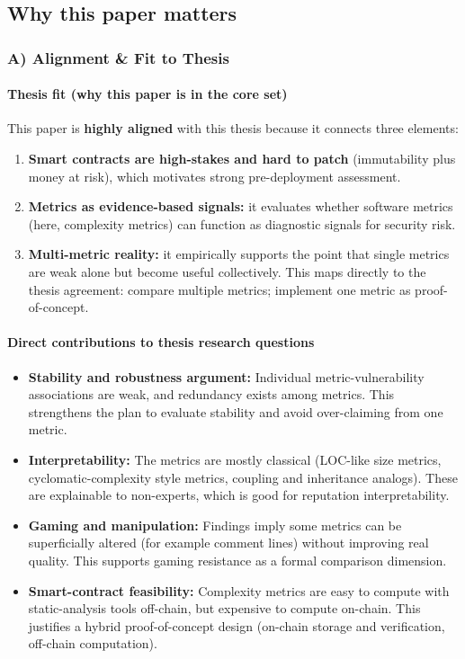 \documentclass[11pt,a4paper]{article}
\begin{document}
\subsection{Why this paper matters}
\subsubsection*{A) Alignment \& Fit to Thesis}
\paragraph{Thesis fit (why this paper is in the core set)}
This paper is \textbf{highly aligned} with this thesis because it connects three elements:
\begin{enumerate}[leftmargin=*]
  \item \textbf{Smart contracts are high-stakes and hard to patch} (immutability plus money at risk), which motivates strong pre-deployment assessment.
  \item \textbf{Metrics as evidence-based signals:} it evaluates whether software metrics (here, complexity metrics) can function as diagnostic signals for security risk.
  \item \textbf{Multi-metric reality:} it empirically supports the point that single metrics are weak alone but become useful collectively. This maps directly to the thesis agreement: compare multiple metrics; implement one metric as proof-of-concept.
\end{enumerate}

\paragraph{Direct contributions to thesis research questions}
\begin{itemize}[leftmargin=*]
  \item \textbf{Stability and robustness argument:} Individual metric-vulnerability associations are weak, and redundancy exists among metrics. This strengthens the plan to evaluate stability and avoid over-claiming from one metric.
  \item \textbf{Interpretability:} The metrics are mostly classical (LOC-like size metrics, cyclomatic-complexity style metrics, coupling and inheritance analogs). These are explainable to non-experts, which is good for reputation interpretability.
  \item \textbf{Gaming and manipulation:} Findings imply some metrics can be superficially altered (for example comment lines) without improving real quality. This supports gaming resistance as a formal comparison dimension.
  \item \textbf{Smart-contract feasibility:} Complexity metrics are easy to compute with static-analysis tools off-chain, but expensive to compute on-chain. This justifies a hybrid proof-of-concept design (on-chain storage and verification, off-chain computation).
\end{itemize}
\end{document}

